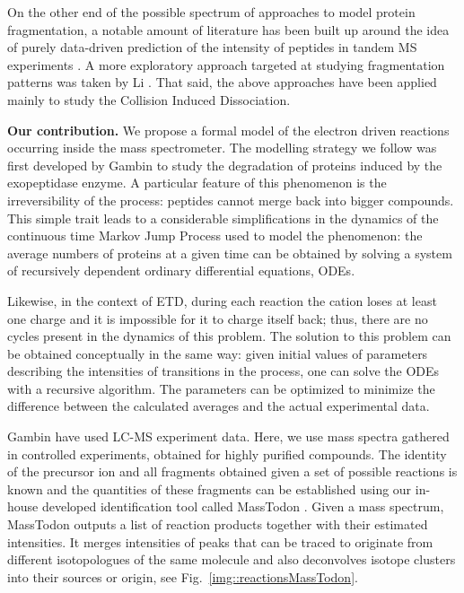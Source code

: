 \documentclass{llncs}
\begin{document}
        On the other end of the possible spectrum of approaches to model protein fragmentation, a notable amount of literature has been built up around the idea of purely data-driven prediction of the intensity of peptides in tandem MS experiments \cite{Elias2004-fr,Arnold2006-wn,Degroeve2013-ej} . A more exploratory approach targeted at studying fragmentation patterns was taken by Li \cite{Li2011-mq}. That said, the above approaches have been applied mainly to study the Collision Induced Dissociation.

\textbf{Our contribution.}
        We propose a formal model of the electron driven reactions occurring inside the mass spectrometer. The modelling strategy we follow was first developed by Gambin \cite{Gambin2010} to study the degradation of proteins induced by the exopeptidase enzyme. A particular feature of this phenomenon is the irreversibility of the process: peptides cannot merge back into bigger compounds. This simple trait leads to a considerable simplifications in the dynamics of the continuous time Markov Jump Process used to model the phenomenon: the average numbers of proteins at a given time can be obtained by solving a system of recursively dependent ordinary differential equations, ODEs.

        Likewise, in the context of ETD, during each reaction the cation loses at least one charge and it is impossible for it to charge itself back; thus, there are no cycles present in the dynamics of this problem. The solution to this problem can be obtained conceptually in the same way: given initial values of parameters describing the intensities of transitions in the process, one can solve the ODEs with a recursive algorithm. The parameters can be optimized to minimize the difference between the calculated averages and the actual experimental data.

        Gambin \cite{Gambin2010} have used LC-MS experiment data. Here, we use mass spectra gathered in controlled experiments, obtained for highly purified compounds. The identity of the precursor ion and all fragments obtained given a set of possible reactions is known and the quantities of these fragments can be established using our in-house developed identification tool called MassTodon \cite{Lermyte2015-lm,Lermyte2017-zt}. Given a mass spectrum, MassTodon outputs a list of reaction products together with their estimated intensities. It merges intensities of peaks that can be traced to originate from different isotopologues of the same molecule and also deconvolves isotope clusters into their sources or origin, see Fig.~\ref{img::reactionsMassTodon}.
\end{document}
